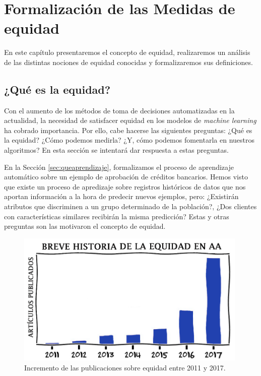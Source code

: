 \documentclass[oneside,openright,titlepage,numbers=noenddot,openany,headinclude,footinclude=true,
cleardoublepage=empty,abstractoff,BCOR=5mm,paper=a4,fontsize=12pt,main=spanish]{scrreprt}
\begin{document}
\chapter{Formalización de las Medidas de equidad}

\label{ch:formalmedeq}

En este capítulo presentaremos el concepto de equidad, realizaremos un análisis de las distintas nociones de equidad conocidas y formalizaremos sus definiciones.

\section{¿Qué es la equidad?}

Con el aumento de los métodos de toma de decisiones automatizadas en la actualidad, la necesidad de satisfacer equidad en los modelos de \textit{machine learning} ha cobrado importancia. Por ello, cabe hacerse las siguientes preguntas: ¿Qué es la equidad? ¿Cómo podemos medirla? ¿Y, cómo podemos fomentarla en nuestros algoritmos? En esta sección se intentará dar respuesta a estas preguntas.

En la Sección \ref{sec:queaprendizaje}, formalizamos el proceso de aprendizaje automático sobre un ejemplo de aprobación de créditos bancarios. Hemos visto que existe un proceso de apredizaje sobre registros históricos de datos que nos aportan información a la hora de predecir nuevos ejemplos, pero: ¿Existirán atributos que discriminen a un grupo determinado de la población?, ¿Dos clientes con características similares recibirán la misma predicción? Estas y otras preguntas son las motivaron el concepto de equidad.\\

\begin{figure}[h]
	\centering
	\includegraphics[width=11.05cm]{exponencial.png}
	\caption{Incremento de las publicaciones sobre equidad entre 2011 y 2017.}
\end{figure}
\end{document}

